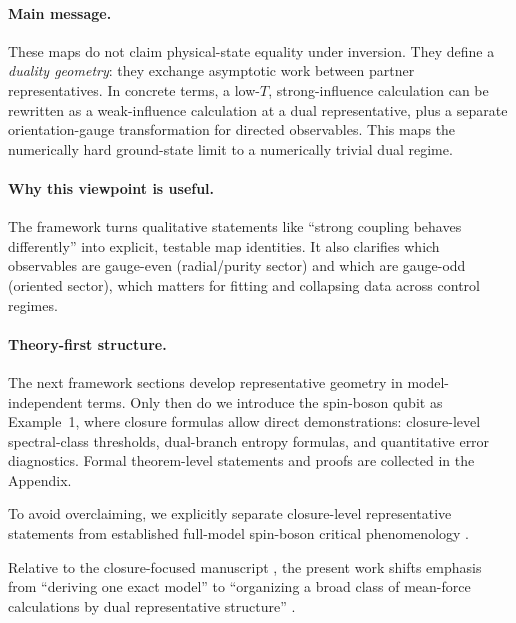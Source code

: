 \paragraph{Main message.}
These maps do not claim physical-state equality under inversion.
They define a \emph{duality geometry}: they exchange asymptotic work between partner representatives.
In concrete terms, a low-\(T\), strong-influence calculation can be rewritten as a weak-influence
calculation at a dual representative, plus a separate orientation-gauge transformation for directed
observables. This maps the numerically hard ground-state limit to a numerically trivial dual regime.

\paragraph{Why this viewpoint is useful.}
The framework turns qualitative statements like ``strong coupling behaves differently'' into
explicit, testable map identities.
It also clarifies which observables are gauge-even (radial/purity sector) and which are gauge-odd
(oriented sector), which matters for fitting and collapsing data across control regimes.

\paragraph{Theory-first structure.}
The next framework sections develop representative geometry in model-independent terms.
Only then do we introduce the spin-boson qubit as Example~1, where closure formulas allow direct demonstrations:
closure-level spectral-class thresholds, dual-branch entropy formulas, and quantitative error
diagnostics.
Formal theorem-level statements and proofs are collected in the Appendix.

To avoid overclaiming, we explicitly separate closure-level representative statements from established
full-model spin-boson critical phenomenology
\cite{leggettDynamicsDissipativeTwostate1987,weissQuantumDissipativeSystems2012,bullaQuantumPhaseTransitionSubohmic2003,winterQuantumPhaseTransitionSubohmic2009}.

Relative to the closure-focused manuscript \cite{mccaulMeanForceHamiltoniansInfluence2026}, the
present work shifts emphasis from ``deriving one exact model'' to ``organizing a broad class of
mean-force calculations by dual representative structure''
\cite{jarzynskiNonequilibriumWorkTheorem2004,campisiFluctuationTheoremArbitrary2009,trushechkinOpenQuantumSystem2022}.

